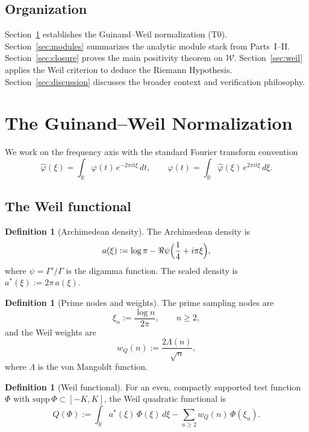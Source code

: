 \documentclass[11pt,a4paper]{article}
\theoremstyle{definition}
\newtheorem{definition}[theorem]{Definition}
\newcommand{\RR}{\mathbb{R}}
\newcommand{\WW}{\mathcal{W}}
\begin{document}
\subsection*{Organization}

Section~\ref{sec:T0} establishes the Guinand--Weil normalization (T0). Section~\ref{sec:modules} summarizes the analytic module stack from Parts~I--II. Section~\ref{sec:closure} proves the main positivity theorem on $\WW$. Section~\ref{sec:weil} applies the Weil criterion to deduce the Riemann Hypothesis. Section~\ref{sec:discussion} discusses the broader context and verification philosophy.

\section{The Guinand--Weil Normalization}\label{sec:T0}

We work on the frequency axis with the standard Fourier transform convention
\begin{equation}\label{eq:fourier}
\widehat{\varphi}(\xi) = \int_{\RR} \varphi(t)\,e^{-2\pi i t\xi}\,dt, \qquad \varphi(t) = \int_{\RR} \widehat{\varphi}(\xi)\,e^{2\pi i t\xi}\,d\xi.
\end{equation}

\subsection{The Weil functional}

\begin{definition}[Archimedean density]\label{def:arch-density}
The Archimedean density is
\[
a(\xi) := \log\pi - \Re\psi\Bigl(\frac{1}{4} + i\pi\xi\Bigr),
\]
where $\psi = \Gamma'/\Gamma$ is the digamma function. The scaled density is $a^*(\xi) := 2\pi\,a(\xi)$.
\end{definition}

\begin{definition}[Prime nodes and weights]\label{def:prime-nodes}
The prime sampling nodes are
\[
\xi_n := \frac{\log n}{2\pi}, \qquad n \ge 2,
\]
and the Weil weights are
\[
w_Q(n) := \frac{2\Lambda(n)}{\sqrt{n}},
\]
where $\Lambda$ is the von Mangoldt function.
\end{definition}

\begin{definition}[Weil functional]\label{def:weil-functional}
For an even, compactly supported test function $\Phi$ with $\mathrm{supp}\,\Phi \subset [-K, K]$, the Weil quadratic functional is
\begin{equation}\label{eq:Q-def}
Q(\Phi) := \int_{\RR} a^*(\xi)\,\Phi(\xi)\,d\xi - \sum_{n \ge 2} w_Q(n)\,\Phi(\xi_n).
\end{equation}
\end{definition}
\end{document}
